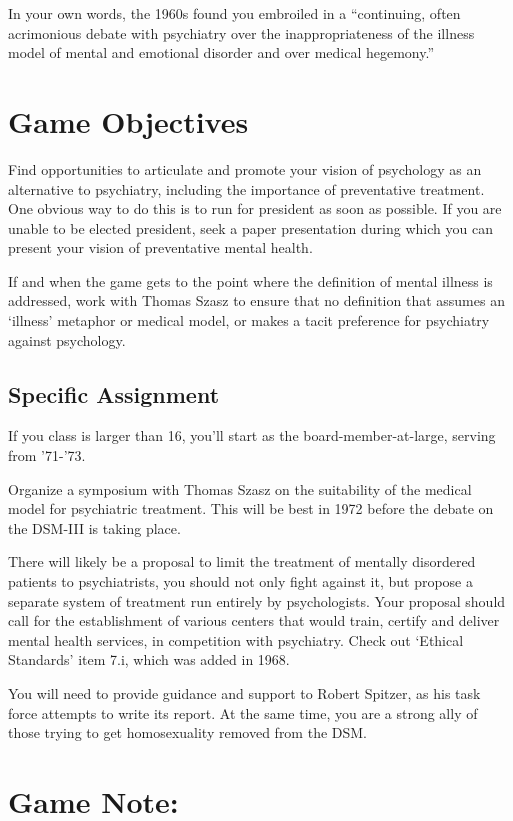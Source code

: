 In your own words, the 1960s found you embroiled in a “continuing, often acrimonious debate with psychiatry over the inappropriateness of the illness model of mental and emotional disorder and over medical hegemony.”

\section{Game Objectives}
\label{gameobjectives}

Find opportunities to articulate and promote your vision of psychology as an alternative to psychiatry, including the importance of preventative treatment. One obvious way to do this is to run for president as soon as possible. If you are unable to be elected president, seek a paper presentation during which you can present your vision of preventative mental health.

If and when the game gets to the point where the definition of mental illness is addressed, work with Thomas Szasz to ensure that no definition that assumes an ‘illness’ metaphor or medical model, or makes a tacit preference for psychiatry against psychology.

\subsection{Specific Assignment}
\label{specificassignment}

If you class is larger than 16, you'll start as the board-member-at-large, serving from '71-'73.

Organize a symposium with Thomas Szasz on the suitability of the medical model for psychiatric treatment. This will be best in 1972 before the debate on the DSM-III is taking place.

There will likely be a proposal to limit the treatment of mentally disordered patients to psychiatrists, you should not only fight against it, but propose a separate system of treatment run entirely by psychologists. Your proposal should call for the establishment of various centers that would train, certify and deliver mental health services, in competition with psychiatry. Check out `Ethical Standards' item 7.i, which was added in 1968.

You will need to provide guidance and support to Robert Spitzer, as his task force attempts to write its report. At the same time, you are a strong ally of those trying to get homosexuality removed from the DSM.

\section{Game Note:}
\label{gamenote:}

